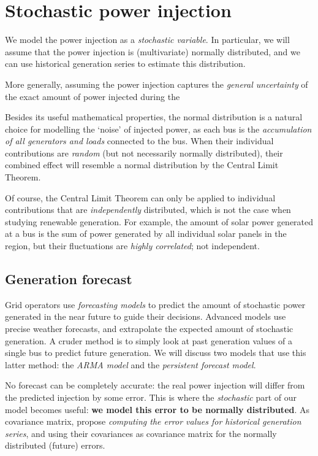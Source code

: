 \documentclass[main.tex]{subfiles}
\begin{document}
\section{Stochastic power injection}
We model the power injection as a \emph{stochastic variable}. In particular, we will assume that the power injection is (multivariate) normally distributed, and we can use historical generation series to estimate this distribution. 



More generally, assuming the power injection captures the \emph{general uncertainty} of the exact amount of power injected during the 

Besides its useful mathematical properties, the normal distribution is a natural choice for modelling the `noise' of injected power, as each bus is the \emph{accumulation of all generators and loads} connected to the bus. When their individual contributions are \emph{random} (but not necessarily normally distributed), their combined effect will resemble a normal distribution by the Central Limit Theorem. 

Of course, the Central Limit Theorem can only be applied to individual contributions that are \emph{independently} distributed, which is not the case when studying renewable generation. For example, the amount of solar power generated at a bus is the sum of power generated by all individual solar panels in the region, but their fluctuations are \emph{highly correlated}; not independent.

\subsection{Generation forecast}
Grid operators use \emph{forecasting models} to predict the amount of stochastic power generated in the near future to guide their decisions. Advanced models use precise weather forecasts, and extrapolate the expected amount of stochastic generation. A cruder method is to simply look at past generation values of a single bus to predict future generation. We will discuss two models that use this latter method: the \emph{ARMA model} and the \emph{persistent forecast model}.

No forecast can be completely accurate: the real power injection will differ from the predicted injection by some error. This is where the \emph{stochastic} part of our model becomes useful: \textbf{we model this error to be normally distributed}. As covariance matrix, \cite{Nesti2018emergentfailures} propose \emph{computing the error values for historical generation series}, and using their covariances as covariance matrix for the normally distributed (future) errors.
\end{document}
